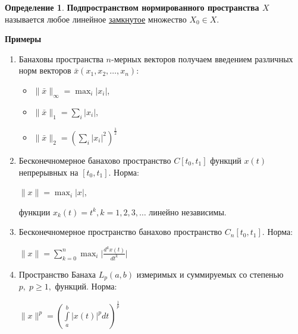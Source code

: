 \documentclass[12pt,a4paper,titlepage]{book}
\theoremstyle{definition}
\newtheorem*{definition}{Определение}
\theoremstyle{plain}
\theoremstyle{remark}
\theoremstyle{remark}
\theoremstyle{remark}
\theoremstyle{plain}
\begin{document}
\begin{definition}
\textbf{Подпространством нормированного пространства $X$} называется любое линейное \underline{замкнутое} множество $X_0 \in X$.
\end{definition}

\textbf{Примеры}

\begin{enumerate}

	\item Банаховы пространства $n$-мерных векторов получаем введением различных норм векторов $\bar{x}(x_1,x_2,\dots,x_n)$:

	\begin{itemize}

		\item $\lVert \bar{x}\rVert_\infty=\displaystyle\max_{i}\lvert x_i\rvert$,

		\item $\lVert \bar{x}\rVert_1 = \displaystyle\sum_{i}\lvert x_i\rvert$,

		\item $\lVert \bar{x}\rVert_2 = (\displaystyle\sum_{i}\lvert x_i\rvert^2)^{\frac{1}{2}}$

	\end{itemize}

	\item Бесконечномерное банахово пространство $C[t_0,t_1]$ функций $x(t)$ непрерывных на $[t_0,t_1]$. Норма:

	\begin{center}
	$\lVert x\rVert = \displaystyle\max_{i}\lvert x\rvert$,
	\end{center}

	функции $x_k(t)=t^k, k=1,2,3,\dots$ линейно независимы.

	\item Бесконечномерное пространство банахово пространство $C_n[t_0,t_1]$. Норма:

	\begin{center}
	$\lVert x\rVert = \displaystyle\sum_{k=0}^n\max_{i}\lvert\frac{d^kx(t)}{dt^k}\rvert$
	\end{center}

	\item Пространство Банаха $L_p(a,b)$ измеримых и суммируемых со степенью $p,\;p\geq1,$ функций. Норма:

	\begin{center}
	$\lVert x\rVert^p = (\int\limits_a^b\lvert x(t)\rvert^pdt)^{\frac{1}{p}}$
	\end{center}


\end{enumerate}
\end{document}
